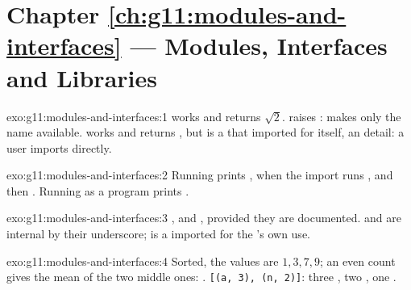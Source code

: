 \section*{Chapter \ref{ch:g11:modules-and-interfaces} --- Modules, Interfaces and Libraries}

\begin{solution}{exo:g11:modules-and-interfaces:1}
 works and returns $\sqrt{2}$.  raises :
 makes only the name  available.  works and returns
, but  is a  that  imported for itself, an  detail: a user
imports  directly.
\end{solution}

\begin{solution}{exo:g11:modules-and-interfaces:2}
Running  prints , when the import runs , and then .
Running  as a program prints .
\end{solution}

\begin{solution}{exo:g11:modules-and-interfaces:3}
,  and , provided they are documented.  and  are internal
by their underscore;  is a  imported for the 's own use.
\end{solution}

\begin{solution}{exo:g11:modules-and-interfaces:4}
Sorted, the values are $1, 3, 7, 9$; an even count gives the mean of the two middle ones: .
\texttt{[(\textquotesingle{}a\textquotesingle{}, 3), (\textquotesingle{}n\textquotesingle{}, 2)]}: three , two , one .
\end{solution}


